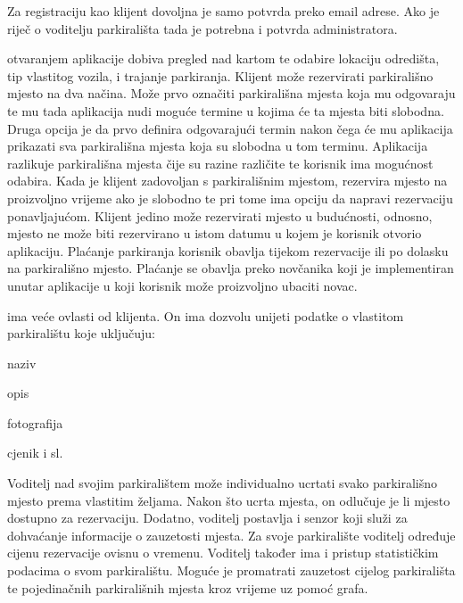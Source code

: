 		Za registraciju kao klijent dovoljna je samo potvrda preko email adrese. Ako je riječ o voditelju parkirališta tada je potrebna i potvrda administratora.
		
		   otvaranjem aplikacije dobiva pregled nad kartom te odabire lokaciju odredišta, tip vlastitog vozila, i trajanje parkiranja. Klijent može rezervirati parkirališno mjesto na dva načina. Može prvo označiti parkirališna mjesta koja mu odgovaraju te mu tada aplikacija nudi moguće termine u kojima će ta mjesta biti slobodna. Druga opcija je da prvo definira odgovarajući termin nakon čega će mu aplikacija prikazati sva parkirališna mjesta koja su slobodna u tom terminu. Aplikacija razlikuje parkirališna mjesta čije su razine različite te korisnik ima mogućnost odabira. Kada je klijent zadovoljan s parkirališnim mjestom, rezervira mjesto na proizvoljno vrijeme ako je slobodno te pri tome ima opciju da napravi rezervaciju ponavljajućom. Klijent jedino može rezervirati mjesto u budućnosti, odnosno, mjesto ne može biti rezervirano u istom datumu u kojem je korisnik otvorio aplikaciju. Plaćanje parkiranja korisnik obavlja tijekom rezervacije ili po dolasku na parkirališno mjesto. Plaćanje se obavlja preko novčanika koji je implementiran unutar aplikacije u koji korisnik može proizvoljno ubaciti novac. 
		
		  ima veće ovlasti od klijenta. On ima dozvolu unijeti podatke o vlastitom parkiralištu koje uključuju:
		  
		  
		 
		 \begin{packed_item}
		 	\item naziv
		 	\item opis
		 	\item fotografija
		 	\item cjenik i sl.
		 \end{packed_item}
		
		\noindent Voditelj nad svojim parkiralištem može individualno ucrtati svako parkirališno mjesto prema vlastitim željama. Nakon što ucrta mjesta, on odlučuje je li mjesto dostupno za rezervaciju. Dodatno, voditelj postavlja i senzor koji služi za dohvaćanje informacije o zauzetosti mjesta. Za svoje parkiralište voditelj određuje cijenu rezervacije ovisnu o vremenu. Voditelj također ima i pristup statističkim podacima o svom parkiralištu. Moguće je promatrati zauzetost cijelog parkirališta te pojedinačnih parkirališnih mjesta kroz vrijeme uz pomoć grafa.
		
